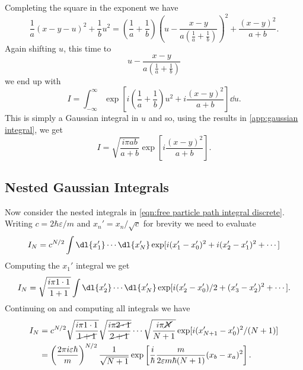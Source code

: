 \documentclass[fleqn]{NotesClass}
\begin{document}
    Completing the square in the exponent we have
    \begin{equation}
        \frac{1}{a}(x - y - u)^2 + \frac{1}{b}u^2 = \left( \frac{1}{a} + \frac{1}{b} \right)\left( u - \frac{x - y}{a\left( \frac{1}{a} + \frac{1}{b} \right)} \right)^2 + \frac{(x - y)^2}{a + b}.
    \end{equation}
    Again shifting \(u\), this time to
    \begin{equation}
        u - \frac{x - y}{a\left( \frac{1}{a} + \frac{1}{b} \right)}
    \end{equation}
    we end up with
    \begin{equation}
        I = \int_{-\infty}^{\infty} \exp\left[ i\left(\frac{1}{a} + \frac{1}{b}\right)u^2 + i\frac{(x - y)^2}{a + b} \right] \dd{u}.
    \end{equation}
    This is simply a Gaussian integral in \(u\) and so, using the results in \cref{app:gaussian integral}, we get
    \begin{equation}
        I = \sqrt{\frac{i\pi ab}{a + b}} \exp\left[ i\frac{(x - y)^2}{a + b} \right].
    \end{equation}
    
    \subsection{Nested Gaussian Integrals}
    Now consider the nested integrals in \cref{eqn:free particle path integral discrete}.
    Writing \(c = 2\hbar \varepsilon/m\) and \(x_n' = x_n/\sqrt{c}\) for brevity we need to evaluate
    \begin{equation}
        I_N = c^{N/2} \int \dl{x_1'} \dotsm \dl{x_N'} \exp[i(x_1' - x_0')^2 + i(x_2' - x_1')^2 + \dotsb ]
    \end{equation}
    Computing the \(x_1'\) integral we get
    \begin{equation}
        I_N = \sqrt{\frac{i \pi 1\cdot 1}{1 + 1}} \int \dl{x_2'} \dotsm \dl{x_N'} \exp[i(x_2' - x_0')/2 + (x_3' - x_2')^2 + \dotsm].
    \end{equation}
    Continuing on and computing all integrals we have
    \begin{align}
        I_N &= c^{N/2} \sqrt{\frac{i\pi 1\cdot1}{\cancel{1 + 1}}} \sqrt{\frac{i\pi \cancel{2\cdot 1}}{\cancel{2 + 1}}} \dotsm \sqrt{\frac{i\pi \cancel{N}}{N + 1}} \exp[i(x'_{N+1} - x_0')^2/(N+1)]\\
        &= \left( \frac{2\pi i\varepsilon \hbar}{m} \right)^{N/2} \frac{1}{\sqrt{N + 1}} \exp\left[ \frac{i}{\hbar}\frac{m}{2\varepsilon m\hbar(N+1)} (x_b - x_a)^2 \right].
    \end{align}
    
\end{document}
